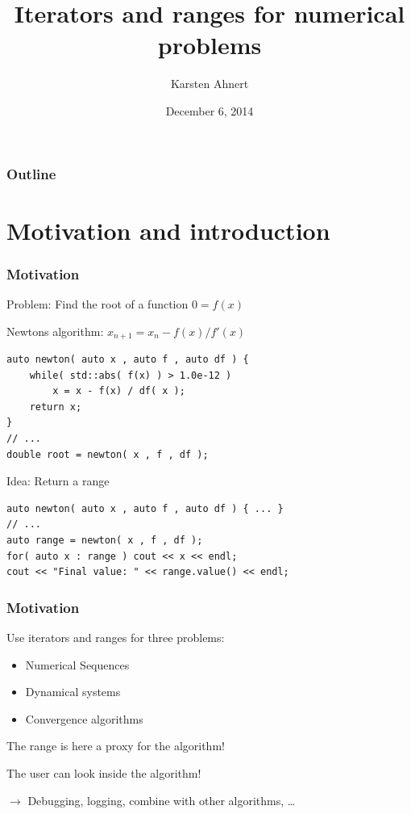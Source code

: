 \documentclass{beamer}
\title[Iteratorst]{Iterators and ranges for numerical problems}
\author[Karsten Ahnert]{Karsten Ahnert}
\institute[Ambrosys]{Ambrosys GmbH, Potsdam}
\date{December 6, 2014}
\newcommand{\heading}[1]{\frametitle{#1}}
\begin{document}
\frame{
  \titlepage


}



\begin{frame}
  \heading{Outline}

  \tableofcontents
\end{frame}



\section{Motivation and introduction}




\begin{frame}[fragile]
\heading{Motivation}

Problem: Find the root of a function \hspace{2ex} $0=f(x)$

\vspace{0.5ex}
Newtons algorithm: \hspace{2ex} $x_{n+1} = x_n - f(x)/f'(x)$
\vspace{2ex}
  \begin{lstlisting}[basicstyle=\scriptsize\ttfamily]
auto newton( auto x , auto f , auto df ) {
    while( std::abs( f(x) ) > 1.0e-12 )
        x = x - f(x) / df( x );
    return x;
}
// ...
double root = newton( x , f , df );
  \end{lstlisting}
\vspace{2ex}

\pause
Idea: Return a range
\begin{lstlisting}[basicstyle=\scriptsize\ttfamily]
auto newton( auto x , auto f , auto df ) { ... }
// ...
auto range = newton( x , f , df );
for( auto x : range ) cout << x << endl;
cout << "Final value: " << range.value() << endl;
\end{lstlisting}

\end{frame}



\begin{frame}[fragile]
 \heading{Motivation}
 
 Use iterators and ranges for three problems:
 
 \begin{itemize}
  \item Numerical Sequences
  \item Dynamical systems
  \item Convergence algorithms
 \end{itemize}
 
 \vspace{2ex}
 
 The range is here a proxy for the algorithm!
 
 \vspace{2ex}
 The user can look inside the algorithm!
 
 $\longrightarrow$ Debugging, logging, combine with other algorithms, \dots

\end{frame}
\end{document}
